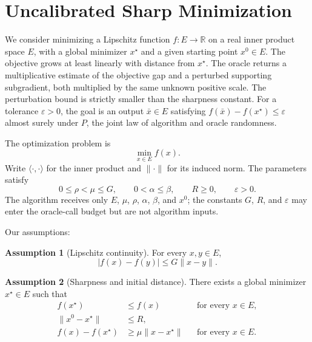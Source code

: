 \documentclass[10pt]{article}
\theoremstyle{definition}
\newtheorem{assumption}{Assumption}
\begin{document}
\section*{Uncalibrated Sharp Minimization}
We consider minimizing a Lipschitz function $f:E\to\mathbb{R}$ on a real inner product space $E$, with a global minimizer $x^\star$ and a given starting point $x^0\in E$. The objective grows at least linearly with distance from $x^\star$. The oracle returns a multiplicative estimate of the objective gap and a perturbed supporting subgradient, both multiplied by the same unknown positive scale. The perturbation bound is strictly smaller than the sharpness constant. For a tolerance $\varepsilon>0$, the goal is an output $\bar{x}\in E$ satisfying $f(\bar{x})-f(x^\star)\leq\varepsilon$ almost surely under $P$, the joint law of algorithm and oracle randomness.

The optimization problem is
\[
\min_{x\in E} f(x).
\]
Write $\langle\cdot,\cdot\rangle$ for the inner product and $\|\cdot\|$ for its induced norm. The parameters satisfy
\[
0\leq\rho<\mu\leq G,\qquad
0<\alpha\leq\beta,\qquad
R\geq0,\qquad \varepsilon>0.
\]
The algorithm receives only $E$, $\mu$, $\rho$, $\alpha$, $\beta$, and $x^0$; the constants $G$, $R$, and $\varepsilon$ may enter the oracle-call budget but are not algorithm inputs.

Our assumptions:
\begin{assumption}[Lipschitz continuity]
For every $x,y\in E$,
\[
|f(x)-f(y)|\leq G\|x-y\|.
\]
\end{assumption}

\begin{assumption}[Sharpness and initial distance]
There exists a global minimizer $x^\star\in E$ such that
\[
\begin{aligned}
f(x^\star)&\leq f(x) &&\text{for every }x\in E,\\
\|x^0-x^\star\|&\leq R,\\
f(x)-f(x^\star)&\geq\mu\|x-x^\star\|
&&\text{for every }x\in E.
\end{aligned}
\]
\end{assumption}
\end{document}
